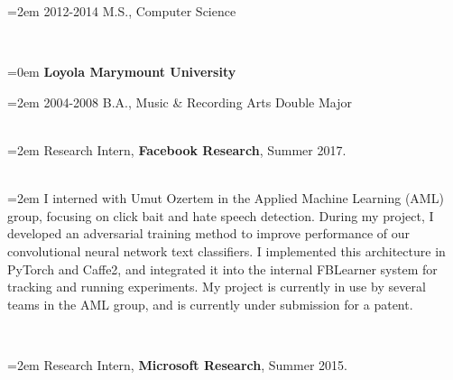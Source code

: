 \documentclass{scrartcl}
\newcommand{\MarginSection}[1]{\marginpar{#1}}
\newcommand{\NewEntry}[2]{\noindent\hangindent=0em\hangafter=0 \parbox{4em}{\small #1} #2 
\vspace{0.35em}} %
\begin{document}
\begin{cv}{}
{\noindent\hangindent=2em 2012-2014 M.S., Computer Science 

}

{~\vspace{-1.25em}\\}

{\noindent\hangindent=0em \textbf{Loyola Marymount University} }

{\noindent\hangindent=2em 2004-2008 B.A., Music \& Recording Arts Double Major

}




    
~\\


\MarginSection{~\\Research\\Experience}\noindent\hangindent=2em Research Intern, \textbf{Facebook Research}, Summer 2017.\\

{~\vspace{-3.5em}\\}

\noindent\hangindent=2em I interned with Umut Ozertem in the 
Applied Machine Learning (AML) group, focusing on click bait and hate speech 
detection.
During my project, I developed an adversarial training method to improve 
performance of our convolutional neural network text classifiers.
I implemented this architecture in PyTorch and Caffe2, and integrated it into
the internal FBLearner system for tracking and running experiments.
My project is currently in use by several teams in the AML group, and is currently under submission for a patent.

{~\vspace{-1.5em}\\}

\noindent\hangindent=2em Research Intern, \textbf{Microsoft Research}, Summer 2015.\\

{~\vspace{-3.5em}\\}


\end{cv}
\end{document}

